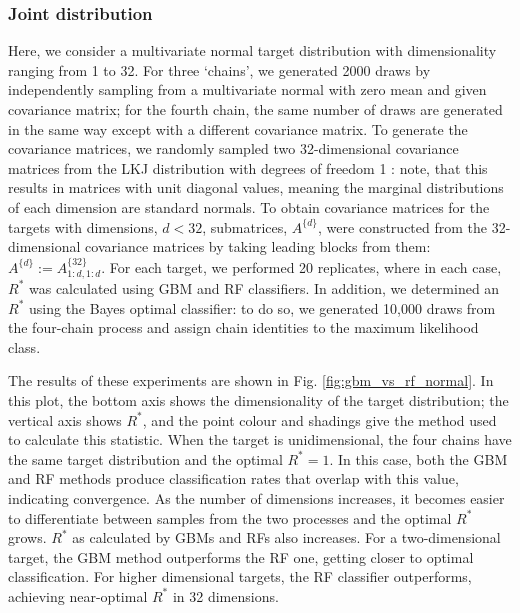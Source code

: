 \documentclass{article}
\begin{document}
\subsubsection{Joint distribution}\label{sec:joint_distribution}
Here, we consider a multivariate normal target distribution with dimensionality ranging from 1 to 32. For three `chains', we generated 2000 draws by independently sampling from a multivariate normal with zero mean and given covariance matrix; for the fourth chain, the same number of draws are generated in the same way except with a different covariance matrix. To generate the covariance matrices, we randomly sampled two 32-dimensional covariance matrices from the LKJ distribution with degrees of freedom 1 \citep{lewandowski2009generating}: note, that this results in matrices with unit diagonal values, meaning the marginal distributions of each dimension are standard normals. To obtain covariance matrices for the targets with dimensions, $d<32$, submatrices, $A^{\{d\}}$, were constructed from the 32-dimensional covariance matrices by taking leading blocks from them: $A^{\{d\}}:=A^{\{32\}}_{1:d, 1:d}$. For each target, we performed 20 replicates, where in each case, $R^*$ was calculated using GBM and RF classifiers. In addition, we determined an $R^*$ using the Bayes optimal classifier: to do so, we generated 10,000 draws from the four-chain process and assign chain identities to the maximum likelihood class.  

The results of these experiments are shown in Fig. \ref{fig:gbm_vs_rf_normal}. In this plot, the bottom axis shows the dimensionality of the target distribution; the vertical axis shows $R^*$, and the point colour and shadings give the method used to calculate this statistic. When the target is unidimensional, the four chains have the same target distribution and the optimal $R^*=1$. In this case, both the GBM and RF methods produce classification rates that overlap with this value, indicating convergence. As the number of dimensions increases, it becomes easier to differentiate between samples from the two processes and the optimal $R^*$ grows. $R^*$ as calculated by GBMs and RFs also increases. For a two-dimensional target, the GBM method outperforms the RF one, getting closer to optimal classification. For higher dimensional targets, the RF classifier outperforms, achieving near-optimal $R^*$ in 32 dimensions.
\end{document}
